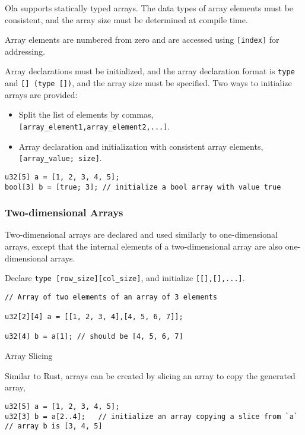 Ola supports statically typed arrays. The data types of array elements must be consistent, and the array size must be determined at compile time. 

Array elements are numbered from zero and are accessed using \texttt{[index]} for addressing.

Array declarations must be initialized, and the array declaration format is \texttt{type} and \texttt{[] (\texttt{type []})}, and the array size must be specified.
Two ways to initialize arrays are provided:
\begin{itemize}
    \item Split the list of elements by commas, \texttt{[array\_element1,array\_element2,...]}.
    \item Array declaration and initialization with consistent array elements, \texttt{[array\_value; size]}.
\end{itemize}

\begin{lstlisting}
u32[5] a = [1, 2, 3, 4, 5]; 
bool[3] b = [true; 3]; // initialize a bool array with value true
\end{lstlisting}

\subsubsection*{Two-dimensional Arrays}

Two-dimensional arrays are declared and used similarly to one-dimensional arrays, except that the internal elements of a two-dimensional array are also one-dimensional arrays. 

Declare \texttt{type [row\_size][col\_size]}, and initialize \texttt{[[],[],...]}.

\begin{lstlisting}
// Array of two elements of an array of 3 elements

u32[2][4] a = [[1, 2, 3, 4],[4, 5, 6, 7]];

u32[4] b = a[1]; // should be [4, 5, 6, 7]
\end{lstlisting}

Array Slicing

Similar to Rust, arrays can be created by slicing an array to copy the generated array,

\begin{lstlisting}
u32[5] a = [1, 2, 3, 4, 5];
u32[3] b = a[2..4];   // initialize an array copying a slice from `a`
// array b is [3, 4, 5]
\end{lstlisting}

